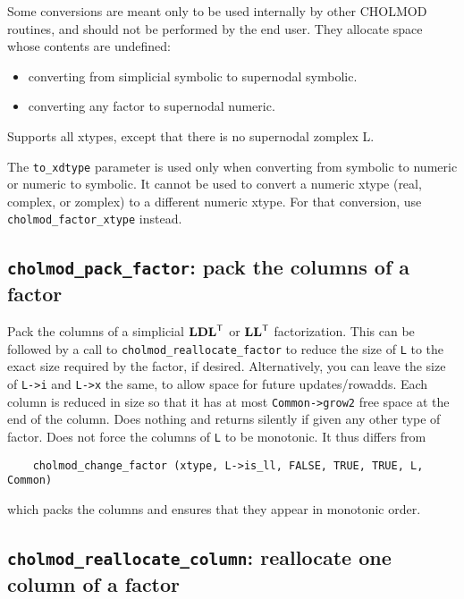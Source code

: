\documentclass[11pt]{article}
\newcommand{\m}[1]{{\bf{#1}}}       %
\newcommand{\tr}{^{\sf T}}          %
\begin{document}
Some conversions are meant only to be used internally by other CHOLMOD
routines, and should not be performed by the end user.  They allocate space
whose contents are undefined:

\begin{itemize}
\item converting from simplicial symbolic to supernodal symbolic.
\item converting any factor to supernodal numeric.
\end{itemize}

Supports all xtypes, except that there is no supernodal zomplex L.

The {\tt to\_xdtype} parameter is used only when converting from symbolic to
numeric or numeric to symbolic.  It cannot be used to convert a numeric xtype
(real, complex, or zomplex) to a different numeric xtype.  For that conversion,
use {\tt cholmod\_factor\_xtype} instead.

\subsection{{\tt cholmod\_pack\_factor}: pack the columns of a factor}


Pack the columns of a simplicial $\m{LDL}\tr$ or $\m{LL}\tr$ factorization.
This can be followed by a call to {\tt cholmod\_reallocate\_factor} to reduce
the size of {\tt L} to the exact size required by the factor, if desired.
Alternatively, you can leave the size of {\tt L->i} and {\tt L->x} the same, to
allow space for future updates/rowadds.  Each column is reduced in size so that
it has at most {\tt Common->grow2} free space at the end of the column.  Does
nothing and returns silently if given any other type of factor.  Does not force
the columns of {\tt L} to be monotonic.  It thus differs from

\begin{verbatim}
    cholmod_change_factor (xtype, L->is_ll, FALSE, TRUE, TRUE, L, Common)
\end{verbatim}

which packs the columns and ensures that they appear in monotonic order.

\subsection{{\tt cholmod\_reallocate\_column}: reallocate one column of a
factor}
\end{document}

